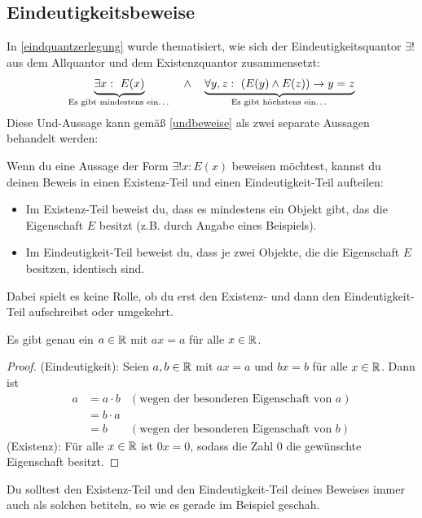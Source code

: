 \subsection*{Eindeutigkeitsbeweise}


In \cref{eindquantzerlegung} wurde thematisiert, wie sich der Eindeutigkeitsquantor $\exists !$ aus dem Allquantor und dem Existenzquantor zusammensetzt:
    \[ \underbrace{\exists x:\ E(x)}_{\text{Es gibt mindestens ein\dots}}\quad \land\quad \underbrace{\forall y,z:\ (E(y)\land E(z)) \to y=z}_{\text{Es gibt höchstens ein\dots}}\]
Diese Und-Aussage kann gemäß \cref{undbeweise} als zwei separate Aussagen behandelt werden:


\begin{satz} \label{eindbeweis} 
    Wenn du eine Aussage der Form $\exists ! x: E(x)$ beweisen möchtest, kannst du deinen Beweis in einen Existenz-Teil und einen Eindeutigkeit-Teil aufteilen:
    \begin{itemize}
        \item Im Existenz-Teil beweist du, dass es mindestens ein Objekt gibt, das die Eigenschaft $E$ besitzt (z.B. durch Angabe eines Beispiels).
        \item Im Eindeutigkeit-Teil beweist du, dass je zwei Objekte, die die Eigenschaft $E$ besitzen, identisch sind.
    \end{itemize}
    Dabei spielt es keine Rolle, ob du erst den Existenz- und dann den Eindeutigkeit-Teil aufschreibst oder umgekehrt.
\end{satz}


\begin{bsp} \label{bsp:eindbeweis}
    Es gibt genau ein $a\in \mathbb R$ mit $ax=a$ für alle $x\in \mathbb R$.
\end{bsp}
\begin{proof}
    (Eindeutigkeit): Seien $a,b\in \mathbb R$ mit $ax=a$ und $bx=b$ für alle $x\in \mathbb R$. Dann ist
    \begin{align*}
        a & = a\cdot b & (\text{wegen der besonderen Eigenschaft von $a$}) \\
        & = b \cdot a  \\
        & = b & (\text{wegen der besonderen Eigenschaft von $b$})
    \end{align*}
    (Existenz): Für alle $x\in \mathbb R$ ist $0x=0$, sodass die Zahl $0$ die gewünschte Eigenschaft besitzt.
\end{proof}


\begin{bem}
    Du solltest den Existenz-Teil und den Eindeutigkeit-Teil deines Beweises immer auch als solchen betiteln, so wie es gerade im Beispiel geschah.
\end{bem}



